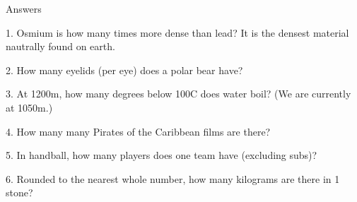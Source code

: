 \begin{frame}
\begin{center}
\Huge
Answers
\end{center}
\end{frame}
\begin{frame}
\begin{center}
\Large
1. Osmium is how many times more dense than lead? It is the densest material nautrally found on earth.
\\
\end{center}
\end{frame}
\begin{frame}
\begin{center}
\Large
2. How many eyelids (per eye) does a polar bear have?
\\
\end{center}
\end{frame}
\begin{frame}
\begin{center}
\Large
3. At 1200m, how many degrees below 100\textdegree C does water boil? (We are currently at 1050m.)
\\
\end{center}
\end{frame}
\begin{frame}
\begin{center}
\Large
4. How many many Pirates of the Caribbean films are there?
\\
\end{center}
\end{frame}
\begin{frame}
\begin{center}
\Large
5. In handball, how many players does one team have (excluding subs)?
\\
\end{center}
\end{frame}
\begin{frame}
\begin{center}
\Large
6. Rounded to the nearest whole number, how many kilograms are there in 1 stone?
\\
\end{center}
\end{frame}
